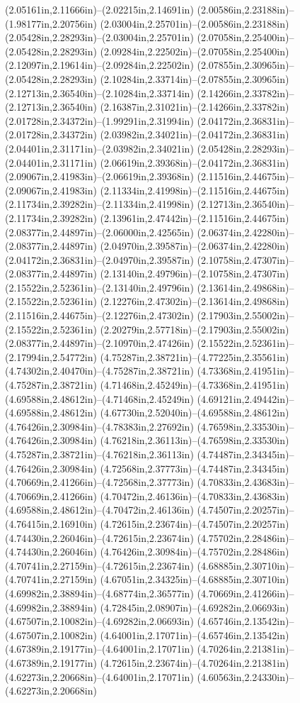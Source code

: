 (2.05161in,2.11666in)--(2.02215in,2.14691in) (2.00586in,2.23188in)--(1.98177in,2.20756in) (2.03004in,2.25701in)--(2.00586in,2.23188in) (2.05428in,2.28293in)--(2.03004in,2.25701in) (2.07058in,2.25400in)--(2.05428in,2.28293in) (2.09284in,2.22502in)--(2.07058in,2.25400in) (2.12097in,2.19614in)--(2.09284in,2.22502in) (2.07855in,2.30965in)--(2.05428in,2.28293in) (2.10284in,2.33714in)--(2.07855in,2.30965in) (2.12713in,2.36540in)--(2.10284in,2.33714in) (2.14266in,2.33782in)--(2.12713in,2.36540in) (2.16387in,2.31021in)--(2.14266in,2.33782in) (2.01728in,2.34372in)--(1.99291in,2.31994in) (2.04172in,2.36831in)--(2.01728in,2.34372in) (2.03982in,2.34021in)--(2.04172in,2.36831in) (2.04401in,2.31171in)--(2.03982in,2.34021in) (2.05428in,2.28293in)--(2.04401in,2.31171in) (2.06619in,2.39368in)--(2.04172in,2.36831in) (2.09067in,2.41983in)--(2.06619in,2.39368in) (2.11516in,2.44675in)--(2.09067in,2.41983in) (2.11334in,2.41998in)--(2.11516in,2.44675in) (2.11734in,2.39282in)--(2.11334in,2.41998in) (2.12713in,2.36540in)--(2.11734in,2.39282in) (2.13961in,2.47442in)--(2.11516in,2.44675in) (2.08377in,2.44897in)--(2.06000in,2.42565in) (2.06374in,2.42280in)--(2.08377in,2.44897in) (2.04970in,2.39587in)--(2.06374in,2.42280in) (2.04172in,2.36831in)--(2.04970in,2.39587in) (2.10758in,2.47307in)--(2.08377in,2.44897in) (2.13140in,2.49796in)--(2.10758in,2.47307in) (2.15522in,2.52361in)--(2.13140in,2.49796in) (2.13614in,2.49868in)--(2.15522in,2.52361in) (2.12276in,2.47302in)--(2.13614in,2.49868in) (2.11516in,2.44675in)--(2.12276in,2.47302in) (2.17903in,2.55002in)--(2.15522in,2.52361in) (2.20279in,2.57718in)--(2.17903in,2.55002in) (2.08377in,2.44897in)--(2.10970in,2.47426in) (2.15522in,2.52361in)--(2.17994in,2.54772in) (4.75287in,2.38721in)--(4.77225in,2.35561in) (4.74302in,2.40470in)--(4.75287in,2.38721in) (4.73368in,2.41951in)--(4.75287in,2.38721in) (4.71468in,2.45249in)--(4.73368in,2.41951in) (4.69588in,2.48612in)--(4.71468in,2.45249in) (4.69121in,2.49442in)--(4.69588in,2.48612in) (4.67730in,2.52040in)--(4.69588in,2.48612in) (4.76426in,2.30984in)--(4.78383in,2.27692in) (4.76598in,2.33530in)--(4.76426in,2.30984in) (4.76218in,2.36113in)--(4.76598in,2.33530in) (4.75287in,2.38721in)--(4.76218in,2.36113in) (4.74487in,2.34345in)--(4.76426in,2.30984in) (4.72568in,2.37773in)--(4.74487in,2.34345in) (4.70669in,2.41266in)--(4.72568in,2.37773in) (4.70833in,2.43683in)--(4.70669in,2.41266in) (4.70472in,2.46136in)--(4.70833in,2.43683in) (4.69588in,2.48612in)--(4.70472in,2.46136in) (4.74507in,2.20257in)--(4.76415in,2.16910in) (4.72615in,2.23674in)--(4.74507in,2.20257in) (4.74430in,2.26046in)--(4.72615in,2.23674in) (4.75702in,2.28486in)--(4.74430in,2.26046in) (4.76426in,2.30984in)--(4.75702in,2.28486in) (4.70741in,2.27159in)--(4.72615in,2.23674in) (4.68885in,2.30710in)--(4.70741in,2.27159in) (4.67051in,2.34325in)--(4.68885in,2.30710in) (4.69982in,2.38894in)--(4.68774in,2.36577in) (4.70669in,2.41266in)--(4.69982in,2.38894in) (4.72845in,2.08907in)--(4.69282in,2.06693in) (4.67507in,2.10082in)--(4.69282in,2.06693in) (4.65746in,2.13542in)--(4.67507in,2.10082in) (4.64001in,2.17071in)--(4.65746in,2.13542in) (4.67389in,2.19177in)--(4.64001in,2.17071in) (4.70264in,2.21381in)--(4.67389in,2.19177in) (4.72615in,2.23674in)--(4.70264in,2.21381in) (4.62273in,2.20668in)--(4.64001in,2.17071in) (4.60563in,2.24330in)--(4.62273in,2.20668in) 